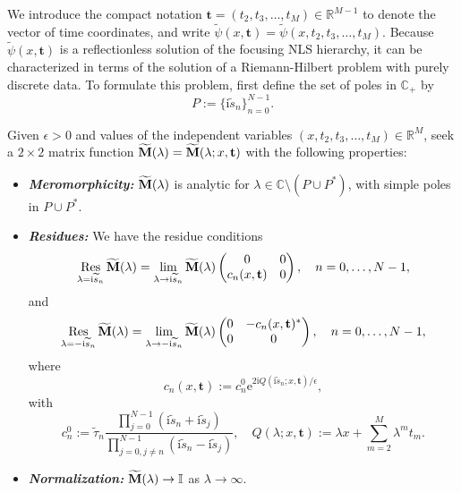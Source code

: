 \documentclass[12pt]{amsart}
\numberwithin{equation}{section}
\newcommand{\ee}{\mathrm{e}}
\newcommand{\ii}{\mathrm{i}}
\newcommand{\SP}{\lambda}
\def\eq{\begin{equation}}
\def\endeq{\end{equation}}
\begin{document}
We introduce the compact notation $\mathbf{t}=(t_2,t_3,\dots,t_M)\in\mathbb{R}^{M-1}$ to denote the vector of time coordinates, and write $\widetilde{\psi}(x,\mathbf{t})=\widetilde{\psi}(x,t_2,t_3,\dots,t_M)$.
Because $\widetilde{\psi}(x,\mathbf{t})$ is a reflectionless solution of the focusing NLS hierarchy, it can be characterized in terms of the solution of a Riemann-Hilbert problem with purely discrete data.  To formulate this problem, first define the 
set of poles in $\mathbb{C}_+$ by
\eq
P:=\{\ii\widetilde{s}_n\}_{n=0}^{N-1}.
\endeq
\begin{myrhp}
\label{rhp-meromorphic}
Given $\epsilon>0$ and values of the independent variables $(x,t_2,t_3,\dots,t_M)\in\mathbb{R}^M$, seek a $2\times 2$ matrix function $\widetilde{\bf M}(\SP)=\widetilde{\bf M}(\SP;x,\mathbf{t})$ with the following properties:
\begin{itemize}
\item[]\textit{\textbf{Meromorphicity:}} $\widetilde{\bf M}(\SP)$ is 
analytic for $\SP\in\mathbb{C}\setminus (P\cup P^*)$, with simple poles 
in $P\cup P^*$.
\item[]\textit{\textbf{Residues:}}  
We have the residue conditions
\begin{equation}
\begin{split}
\mathop{\mathrm{Res}}_{\SP=\ii\widetilde{s}_n}\widetilde{\bf M}(\SP)=\lim_{\SP\to \ii\widetilde{s}_n}\widetilde{\bf M}(\SP) \begin{pmatrix} 0 & 0 \\ c_n(x,\mathbf{t}) & 0 \end{pmatrix}, \quad n=0,\dots,N-1,
\label{eq:RHP-pole-C-plus}
\end{split}
\end{equation}
and
\begin{equation}
\begin{split}
\mathop{\mathrm{Res}}_{\SP=-\ii\widetilde{s}_n}\widetilde{\bf M}(\SP)=\lim_{\SP\to-\ii\widetilde{s}_n}\widetilde{\bf M}(\SP) \begin{pmatrix} 0 & -c_n(x,\mathbf{t})^* \\ 0 & 0 \end{pmatrix}, \quad n=0,\dots,N-1,
\end{split}
\label{eq:RHP-pole-C-minus}
\end{equation}
where
\eq
c_n(x,\mathbf{t}):=c_n^0 \ee^{2\ii Q(\ii\widetilde{s}_n;x,\mathbf{t})/\epsilon},
\label{eq:cn}
\endeq
with
\eq
c_n^0 := \widetilde{\tau}_n\frac{\prod_{j=0}^{N-1}\left(\ii\widetilde{s}_n+\ii\widetilde{s}_j\right)}{\prod_{j=0,j\neq n}^{N-1}\left(\ii\widetilde{s}_n-\ii\widetilde{s}_j\right)}, \quad Q(\SP;x,\mathbf{t}):=\SP x+\sum_{m=2}^M\SP^m t_m.
\label{eq:cn0}
\endeq
\item[]\textit{\textbf{Normalization:}} $\widetilde{\bf M}(\SP)\to\mathbb{I}$ as $\SP\to\infty$.
\end{itemize}
\label{rhp:M-sigma}
\end{myrhp}
\end{document}
